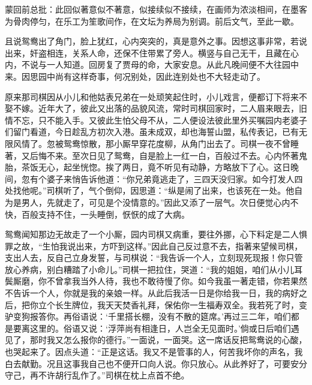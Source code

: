 \begin{parag}
    \begin{note}蒙回前总批：此回似著意似不著意，似接续似不接续，在画师为浓淡相间，在墨客为骨肉停匀，在乐工为笙歌间作，在文坛为养局为别调。前后文气，至此一歇。\end{note}
\end{parag}


\begin{parag}
    且说鸳鸯出了角门，脸上犹红，心内突突的，真是意外之事。因想这事非常，若说出来，奸盗相连，关系人命，还保不住带累了旁人。横竖与自己无干，且藏在心内，不说与一人知道。回房复了贾母的命，大家安息。从此凡晚间便不大往园中来。因思园中尚有这样奇事，何况别处，因此连别处也不大轻走动了。
\end{parag}


\begin{parag}
    原来那司棋因从小儿和他姑表兄弟在一处顽笑起住时，小儿戏言，便都订下将来不娶不嫁。近年大了，彼此又出落的品貌风流，常时司棋回家时，二人眉来眼去，旧情不忘，只不能入手。又彼此生怕父母不从，二人便设法彼此里外买嘱园内老婆子们留门看道，今日趁乱方初次入港。虽未成双，却也海誓山盟，私传表记，已有无限风情了。忽被鸳鸯惊散，那小厮早穿花度柳，从角门出去了。司棋一夜不曾睡著，又后悔不来。至次日见了鸳鸯，自是脸上一红一白，百般过不去。心内怀著鬼胎，茶饭无心，起坐恍惚。挨了两日，竟不听见有动静，方略放下了心。这日晚间，忽有个婆子来悄告诉他道：“你兄弟竟逃走了，三四天没归家。如今打发人四处找他呢。”司棋听了，气个倒仰，因思道：“纵是闹了出来，也该死在一处。他自为是男人，先就走了，可见是个没情意的。”因此又添了一层气。次日便觉心内不快，百般支持不住，一头睡倒，恹恹的成了大病。
\end{parag}


\begin{parag}
    鸳鸯闻知那边无故走了一个小厮，园内司棋又病重，要往外挪，心下料定是二人惧罪之故，“生怕我说出来，方吓到这样。”因此自己反过意不去，指著来望候司棋，支出人去，反自己立身发誓，与司棋说：“我告诉一个人，立刻现死现报！你只管放心养病，别白糟踏了小命儿。”司棋一把拉住，哭道：“我的姐姐，咱们从小儿耳鬓厮磨，你不曾拿我当外人待，我也不敢待慢了你。如今我虽一著走错，你若果然不告诉一个人，你就是我的亲娘一样。从此后我活一日是你给我一日，我的病好之后，把你立个长生牌位，我天天焚香礼拜，保佑你一生福寿双全。我若死了时，变驴变狗报答你。再俗语说：‘千里搭长棚，没有不散的筵席。’再过三二年，咱们都是要离这里的。俗语又说：‘浮萍尚有相逢日，人岂全无见面时。’倘或日后咱们遇见了，那时我又怎么报你的德行。”一面说，一面哭。这一席话反把鸳鸯说的心酸，也哭起来了。因点头道：“正是这话。我又不是管事的人，何苦我坏你的声名，我白去献勤。况且这事我自己也不便开口向人说。你只放心。从此养好了，可要安分守己，再不许胡行乱作了。”司棋在枕上点首不绝。
\end{parag}


